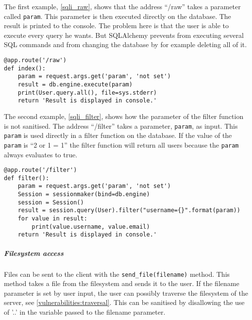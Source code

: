 The first example, \cref{sqli_raw}, shows that the address ``/raw'' takes a parameter called \texttt{param}.
This parameter is then executed directly on the database.
The result is printed to the console.
The problem here is that the user is able to execute every query he wants.
But SQLAlchemy prevents from executing several SQL commands and from changing the database by for example deleting all of it.

\begin{lstlisting}[style=python, caption={An example of executing a raw sql query without sanitising.}, label={sqli_raw}]
@app.route('/raw')
def index():
    param = request.args.get('param', 'not set')
    result = db.engine.execute(param)
    print(User.query.all(), file=sys.stderr)
    return 'Result is displayed in console.'
\end{lstlisting}

The second example, \cref{sqli_filter}, shows how the parameter of the filter function is not sanitised.
The address ``/filter'' takes a parameter, \texttt{param}, as input.
This \texttt{param} is used directly in a filter function on the database.
If the value of the \texttt{param} is ``2 or 1 = 1'' the filter function will return all users because the \texttt{param} always evaluates to true.
\begin{lstlisting}[style=python, caption={An example of inserting a raw sql parameter without sanitising it.}, label={sqli_filter}]
@app.route('/filter')
def filter():
    param = request.args.get('param', 'not set')
    Session = sessionmaker(bind=db.engine)
    session = Session()
    result = session.query(User).filter("username={}".format(param))
    for value in result:
        print(value.username, value.email)
    return 'Result is displayed in console.'
\end{lstlisting}

\subparagraph{Filesystem access}
Files can be sent to the client with the \texttt{send\_file(filename)} method.
This method takes a file from the filesystem and sends it to the user.
If the filename parameter is set by user input, the user can possibly traverse the filesystem of the server, see \cref{vulnerabilities:traversal}.
This can be sanitised by disallowing the use of '..' in the variable passed to the filename parameter.
